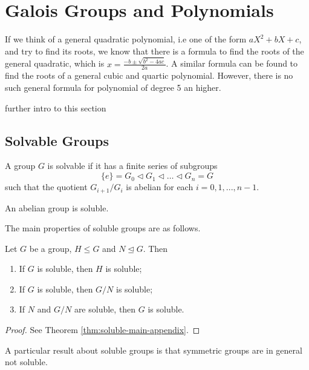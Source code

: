\section{Galois Groups and Polynomials} \label{sec:galois-groups-and-polynomials}
If we think of a general quadratic polynomial, i.e one of the form $aX^2+bX+c$, and try to find its roots, we know that there is a formula to find the roots of the general quadratic, which is $x = \frac{-b \pm \sqrt{b^2 - 4ac}}{2a}$. A similar formula can be found to find the roots of a general cubic and quartic polynomial. However, there is no such general formula for polynomial of degree 5 an higher.

\TODO further intro to this section 
\subsection{Solvable Groups}

\begin{definition} \label{def:soluble}
    A group $G$ is solvable if it has a finite series of subgroups 
    $$ \{ e \} = G_0 \triangleleft G_1 \triangleleft \dots \triangleleft G_n = G$$
    such that the quotient $G_{i+1} / G_{i}$ is abelian for each $i = 0, 1, ...,  n - 1$.
\end{definition}

\begin{observation}
    An abelian group is soluble. 
\end{observation}

The main properties of soluble groups are as follows. 

\begin{theorem} \label{thm:soluble-main}
    Let $G$ be a group, $H \le G$ and $N \trianglelefteq G$. Then 
    \begin{enumerate}[label=(\roman*)]
        \item If $G$ is soluble, then $H$ is soluble;
        \item If $G$ is soluble, then $G / N$ is soluble; 
        \item If $N$ and $G / N$ are soluble, then $G$ is soluble. 
    \end{enumerate}
\end{theorem}
\begin{proof}
	See Theorem \ref{thm:soluble-main-appendix}.
\end{proof}

A particular result about soluble groups is that symmetric groups are in general not soluble.

